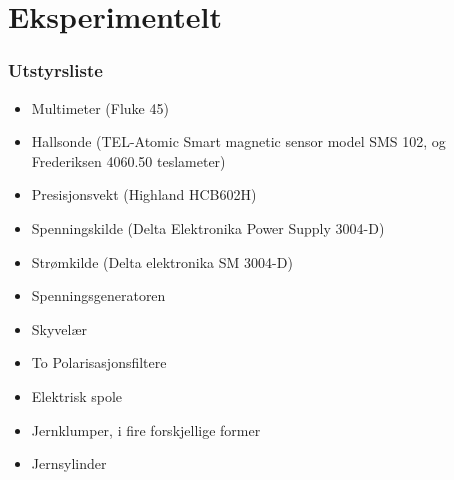 \documentclass[%
 reprint,
 amsmath,amssymb,
 aps,
 norsk,
]{revtex4-1}
\begin{document}
\section{\label{sec:level3}Eksperimentelt}
\subsubsection{Utstyrsliste}
\begin{itemize}
  \item Multimeter (Fluke 45)
  \item Hallsonde (TEL-Atomic Smart magnetic sensor model SMS 102, og Frederiksen 4060.50 teslameter)
  \item Presisjonsvekt (Highland HCB602H)
  \item Spenningskilde (Delta Elektronika Power Supply 3004-D)
  \item Strømkilde (Delta elektronika SM 3004-D)
  \item Spenningsgeneratoren
  \item Skyvelær
  \item To Polarisasjonsfiltere
  \item Elektrisk spole
  \item Jernklumper, i fire forskjellige former
  \item Jernsylinder
\end{itemize}
\end{document}
